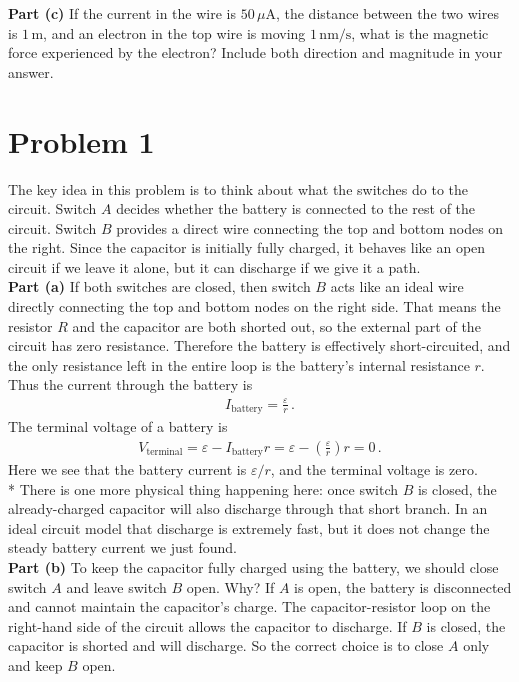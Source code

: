\documentclass[11pt]{article}
\begin{document}
\noindent \textbf{Part (c)} If the current in the wire is $50$\,$\mu$A, the distance between the two wires is $1\,\text{m}$, and an electron in the top wire is moving $1\,\text{nm/s}$, what is the magnetic force experienced by the electron? Include both direction and magnitude in your answer.\\


\newpage
\section*{Problem 1}

The key idea in this problem is to think about what the switches do to the circuit. Switch $A$ decides whether the battery is connected to the rest of the circuit. Switch $B$ provides a direct wire connecting the top and bottom nodes on the right. Since the capacitor is initially fully charged, it behaves like an open circuit if we leave it alone, but it can discharge if we give it a path.\\

\noindent\textbf{Part (a)} If both switches are closed, then switch $B$ acts like an ideal wire directly connecting the top and bottom nodes on the right side. That means the resistor $R$ and the capacitor are both shorted out, so the external part of the circuit has zero resistance. Therefore the battery is effectively short-circuited, and the only resistance left in the entire loop is the battery's internal resistance $r$. Thus the current through the battery is
\begin{align*}
I_{\text{battery}} = \frac{\varepsilon}{r}\,.
\end{align*}
The terminal voltage of a battery is
\begin{align*}
V_{\text{terminal}} = \varepsilon - I_{\text{battery}}r= \varepsilon - \left(\frac{\varepsilon}{r}\right)r = 0\,.
\end{align*}
Here we see that the battery current is $\varepsilon/r$, and the terminal voltage is zero.\\

\noindent ** There is one more physical thing happening here: once switch $B$ is closed, the already-charged capacitor will also discharge through that short branch. In an ideal circuit model that discharge is extremely fast, but it does not change the steady battery current we just found.\\

\noindent\textbf{Part (b)} To keep the capacitor fully charged using the battery, we should close switch $A$ and leave switch $B$ open. Why? If $A$ is open, the battery is disconnected and cannot maintain the capacitor's charge. The capacitor-resistor loop on the right-hand side of the circuit allows the capacitor to discharge. If $B$ is closed, the capacitor is shorted and will discharge. So the correct choice is to close $A$ only and keep $B$ open.\\
\end{document}

